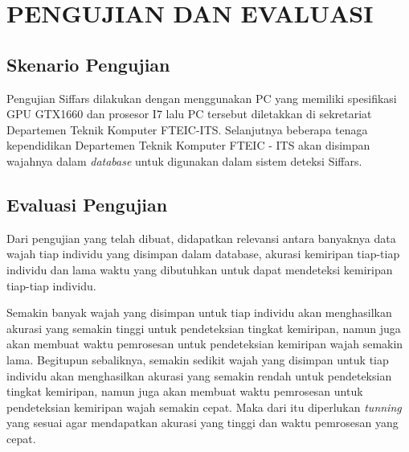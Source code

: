 \chapter{PENGUJIAN DAN EVALUASI}


\section{Skenario Pengujian}

Pengujian Siffars dilakukan dengan menggunakan PC yang memiliki spesifikasi GPU GTX1660 dan prosesor I7 lalu PC
tersebut diletakkan di sekretariat Departemen Teknik Komputer FTEIC-ITS. Selanjutnya beberapa tenaga kependidikan
Departemen Teknik Komputer FTEIC - ITS akan disimpan wajahnya dalam \textit{database} untuk digunakan dalam sistem deteksi Siffars.

\section{Evaluasi Pengujian}

Dari pengujian yang telah dibuat, didapatkan relevansi antara banyaknya data wajah tiap individu yang disimpan dalam database,
akurasi kemiripan tiap-tiap individu dan lama waktu yang dibutuhkan untuk dapat mendeteksi kemiripan tiap-tiap individu.

Semakin banyak wajah yang disimpan untuk tiap individu akan menghasilkan akurasi yang semakin tinggi untuk pendeteksian tingkat kemiripan,
namun juga akan membuat waktu pemrosesan untuk pendeteksian kemiripan wajah semakin lama. Begitupun sebaliknya,
semakin sedikit wajah yang disimpan untuk tiap individu akan menghasilkan akurasi yang semakin rendah untuk pendeteksian tingkat kemiripan,
namun juga akan membuat waktu pemrosesan untuk pendeteksian kemiripan wajah semakin cepat. Maka dari itu diperlukan
\textit{tunning} yang sesuai agar mendapatkan akurasi yang tinggi dan waktu pemrosesan yang cepat.

